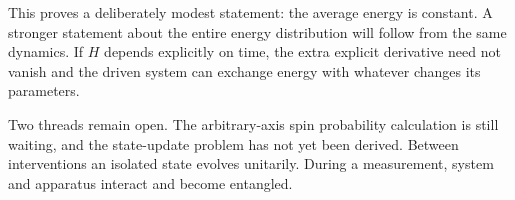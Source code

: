 This proves a deliberately modest statement: the average energy is constant. A stronger statement about the entire energy distribution will follow from the same dynamics. If \(H\) depends explicitly on time, the extra explicit derivative need not vanish and the driven system can exchange energy with whatever changes its parameters.

Two threads remain open. The arbitrary-axis spin probability calculation is still waiting, and the state-update problem has not yet been derived. Between interventions an isolated state evolves unitarily. During a measurement, system and apparatus interact and become entangled.

\begin{classroomqa}
\end{classroomqa}

\begin{classroomqa}
\end{classroomqa}
